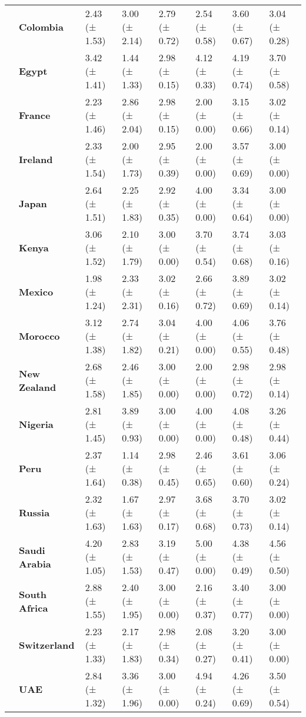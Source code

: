 \begin{longtable}{llllllll}
\textbf{} & \textbf{Colombia} & 2.43 (± 1.53) & 3.00 (± 2.14) & 2.79 (± 0.72) & 2.54 (± 0.58) & 3.60 (± 0.67) & 3.04 (± 0.28) \\
\textbf{} & \textbf{Egypt} & 3.42 (± 1.41) & 1.44 (± 1.33) & 2.98 (± 0.15) & 4.12 (± 0.33) & 4.19 (± 0.74) & 3.70 (± 0.58) \\
\textbf{} & \textbf{France} & 2.23 (± 1.46) & 2.86 (± 2.04) & 2.98 (± 0.15) & 2.00 (± 0.00) & 3.15 (± 0.66) & 3.02 (± 0.14) \\
\textbf{} & \textbf{Ireland} & 2.33 (± 1.54) & 2.00 (± 1.73) & 2.95 (± 0.39) & 2.00 (± 0.00) & 3.57 (± 0.69) & 3.00 (± 0.00) \\
\textbf{} & \textbf{Japan} & 2.64 (± 1.51) & 2.25 (± 1.83) & 2.92 (± 0.35) & 4.00 (± 0.00) & 3.34 (± 0.64) & 3.00 (± 0.00) \\
\textbf{} & \textbf{Kenya} & 3.06 (± 1.52) & 2.10 (± 1.79) & 3.00 (± 0.00) & 3.70 (± 0.54) & 3.74 (± 0.68) & 3.03 (± 0.16) \\
\textbf{} & \textbf{Mexico} & 1.98 (± 1.24) & 2.33 (± 2.31) & 3.02 (± 0.16) & 2.66 (± 0.72) & 3.89 (± 0.69) & 3.02 (± 0.14) \\
\textbf{} & \textbf{Morocco} & 3.12 (± 1.38) & 2.74 (± 1.82) & 3.04 (± 0.21) & 4.00 (± 0.00) & 4.06 (± 0.55) & 3.76 (± 0.48) \\
\textbf{} & \textbf{New Zealand} & 2.68 (± 1.58) & 2.46 (± 1.85) & 3.00 (± 0.00) & 2.00 (± 0.00) & 2.98 (± 0.72) & 2.98 (± 0.14) \\
\textbf{} & \textbf{Nigeria} & 2.81 (± 1.45) & 3.89 (± 0.93) & 3.00 (± 0.00) & 4.00 (± 0.00) & 4.08 (± 0.48) & 3.26 (± 0.44) \\
\textbf{} & \textbf{Peru} & 2.37 (± 1.64) & 1.14 (± 0.38) & 2.98 (± 0.45) & 2.46 (± 0.65) & 3.61 (± 0.60) & 3.06 (± 0.24) \\
\textbf{} & \textbf{Russia} & 2.32 (± 1.63) & 1.67 (± 1.63) & 2.97 (± 0.17) & 3.68 (± 0.68) & 3.70 (± 0.73) & 3.02 (± 0.14) \\
\textbf{} & \textbf{Saudi Arabia} & 4.20 (± 1.05) & 2.83 (± 1.53) & 3.19 (± 0.47) & 5.00 (± 0.00) & 4.38 (± 0.49) & 4.56 (± 0.50) \\
\textbf{} & \textbf{South Africa} & 2.88 (± 1.55) & 2.40 (± 1.95) & 3.00 (± 0.00) & 2.16 (± 0.37) & 3.40 (± 0.77) & 3.00 (± 0.00) \\
\textbf{} & \textbf{Switzerland} & 2.23 (± 1.33) & 2.17 (± 1.83) & 2.98 (± 0.34) & 2.08 (± 0.27) & 3.20 (± 0.41) & 3.00 (± 0.00) \\
\textbf{} & \textbf{UAE} & 2.84 (± 1.32) & 3.36 (± 1.96) & 3.00 (± 0.00) & 4.94 (± 0.24) & 4.26 (± 0.69) & 3.50 (± 0.54) \\
\cline{1-8}
\end{longtable}
